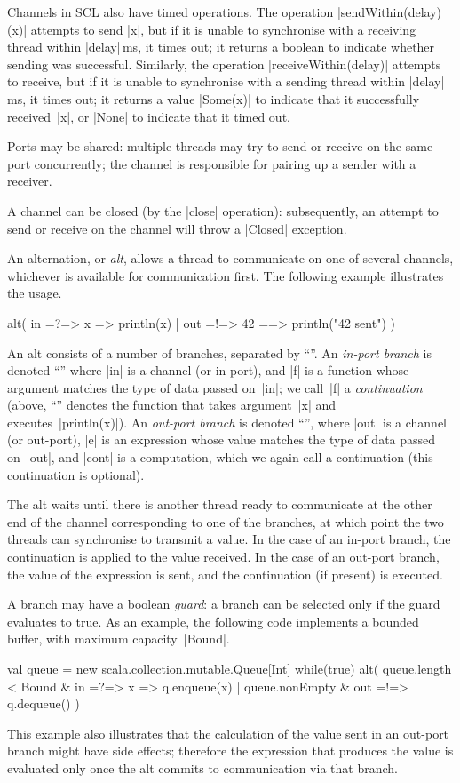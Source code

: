 Channels in SCL also have timed operations.  The operation
|sendWithin(delay)(x)| attempts to send |x|, but if it is unable to
synchronise with a receiving thread within |delay|\,ms, it times out; it
returns a boolean to indicate whether sending was successful.  Similarly, the
operation |receiveWithin(delay)| attempts to receive, but if it is unable to
synchronise with a sending thread within |delay|\,ms, it times out; it returns
a value |Some(x)| to indicate that it successfully received~|x|, or |None| to
indicate that it timed out.

Ports may be shared: multiple threads may try to send or receive on the same
port concurrently; the channel is responsible for pairing up a sender with a
receiver. 

A channel can be closed (by the |close| operation): subsequently, an attempt
to send or receive on the channel will throw a |Closed| exception.

An alternation, or \emph{alt}, allows a thread to communicate on one of
several channels, whichever is available for communication first.  The
following example illustrates the usage.
%
\begin{scala}
alt(
  in =?=> { x => println(x) }
  | out =!=> { 42 } ==> { println("42 sent") }
)
\end{scala}
%
An alt consists of a number of branches, separated by ``\SCALA{\|}''.  An
\emph{in-port branch} is denoted ``'' where |in| is a channel
(or in-port), and |f| is a function whose argument matches the type of data
passed on~|in|; we call~|f| a \emph{continuation} (above, ``'' denotes the function that takes argument~|x| and
executes~|println(x)|).  An \emph{out-port branch} is denoted ``'', where |out| is a channel (or out-port), |e| is an
expression whose value matches the type of data passed on~|out|, and |cont| is
a computation, which we again call a continuation (this continuation is
optional).

The alt waits until there is another thread ready to communicate at the other
end of the channel corresponding to one of the branches, at which point the
two threads can synchronise to transmit a value.  In the case of an in-port
branch, the continuation is applied to the value received.  In the case of an
out-port branch, the value of the expression is sent, and the continuation (if
present) is executed.

A branch may have a boolean \emph{guard}: a branch can be selected only if the
guard evaluates to true.  As an example, the following code implements a
bounded buffer, with maximum capacity~|Bound|.
%
\begin{scala}
val queue = new scala.collection.mutable.Queue[Int]
while(true){
  alt(
    queue.length < Bound & in =?=> { x => q.enqueue(x) }
    | queue.nonEmpty & out =!=> { q.dequeue() }
  )    
}
\end{scala}
%
This example also illustrates that the calculation of the value sent in an
out-port branch might have side effects; therefore the expression that produces
the value is evaluated only once the alt commits to communication via that
branch.

